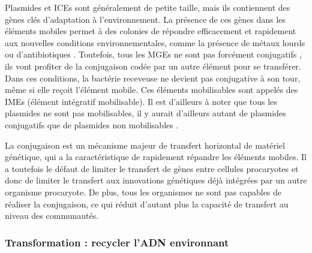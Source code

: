 Plasmides et ICEs sont généralement de petite taille, mais ils contiennent des gènes clés d'adaptation à l'environnement. La présence de ces gènes dans les éléments mobiles permet à des colonies de répondre efficacement et rapidement aux nouvelles conditions environnementales, comme la présence de métaux lourds ou d'antibiotiques \cite{botelho_role_2021}. Toutefois, tous les MGEs ne sont pas forcément conjugatifs \cite{valentine_mobilization_1988}, ils vont profiter de la conjugaison codée par un autre élément pour se transférer. Dans ces conditions, la bactérie receveuse ne devient pas conjugative à son tour, même si elle reçoit l'élément mobile. Ces éléments mobilisables sont appelés des IMEs (élément intégratif mobilisable). Il est d'ailleurs à noter que tous les plasmides ne sont pas mobilisables, il y aurait d'ailleurs autant de plasmides conjugatifs que de plasmides non mobilisables \cite{smillie_mobility_2010}.

La conjugaison est un mécanisme majeur de transfert horizontal de matériel génétique, qui a la caractéristique de rapidement répandre les éléments mobiles. Il a toutefois le défaut de limiter le transfert de gènes entre cellules procaryotes et donc de limiter le transfert aux innovations génétiques déjà intégrées par un autre organisme procaryote. De plus, tous les organismes ne sont pas capables de réaliser la conjugaison, ce qui réduit d'autant plus la capacité de transfert au niveau des communautés.

\newpage
\subsubsection{Transformation : recycler l'ADN environnant}

